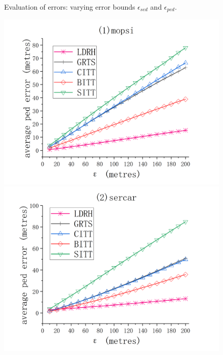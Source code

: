 {{\begin{figure}[tb!]
	\vspace{-2ex}
	\caption{\small Evaluation of \sed errors: varying error bounds $\epsilon_{sed}$ and $\epsilon_{ped}$.}
	\label{fig:sed-error}
	\vspace{-1ex}
\end{figure}

\begin{figure}[tb!]
	\centering
	\includegraphics[scale = 0.555]{figures/Fig-mopsi-ped-error.png}\hspace{1ex}
	\includegraphics[scale = 0.555]{figures/Fig-sercar-ped-error.png}\hspace{1ex}

\end{figure}}}
